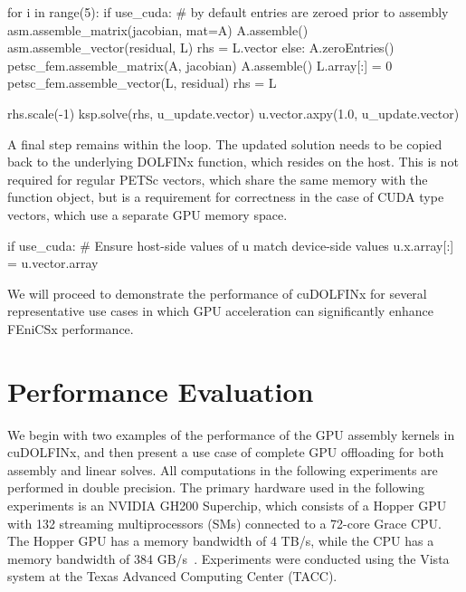 \begin{python}
for i in range(5):
  if use_cuda:
    # by default entries are zeroed prior to assembly
    asm.assemble_matrix(jacobian, mat=A)
    A.assemble()
    asm.assemble_vector(residual, L)
    rhs = L.vector
  else:
    A.zeroEntries()
    petsc_fem.assemble_matrix(A, jacobian)
    A.assemble()
    L.array[:] = 0
    petsc_fem.assemble_vector(L, residual)
    rhs = L

  rhs.scale(-1)
  ksp.solve(rhs, u_update.vector)
  u.vector.axpy(1.0, u_update.vector)
\end{python}
A final step remains within the loop. The updated solution needs to be copied back to the underlying DOLFINx function, which resides on the host. This is not required for regular PETSc vectors, which share the same memory with the function object, but is a requirement for correctness in the case of CUDA type vectors, which use a separate GPU memory space.
\begin{python}
  if use_cuda:
    # Ensure host-side values of u match device-side values
    u.x.array[:] = u.vector.array
\end{python}

We will proceed to demonstrate the performance of cuDOLFINx for several representative use cases in which GPU acceleration can significantly enhance FEniCSx performance.

\section*{Performance Evaluation}
We begin with two examples of the performance of the GPU assembly kernels in cuDOLFINx, and then present a use case of complete GPU offloading for both assembly and linear solves. All computations in the following experiments are performed in double precision. The primary hardware used in the following experiments is an NVIDIA GH200 Superchip, which consists of a Hopper GPU with 132 streaming multiprocessors (SMs) connected to a 72-core Grace CPU. The Hopper GPU has a memory bandwidth of 4 TB/s, while the CPU has a memory bandwidth of 384 GB/s~\citep{gh200specs}. Experiments were conducted using the Vista system at the Texas Advanced Computing Center (TACC).

